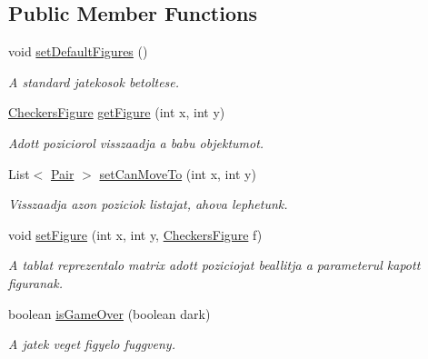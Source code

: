 \subsection*{Public Member Functions}
\begin{DoxyCompactItemize}
\item 
\hypertarget{classmodel_1_1_checkers_model_ac6911ccd3b1d3718db06fd8ea7f2d7b3}{}void \hyperlink{classmodel_1_1_checkers_model_ac6911ccd3b1d3718db06fd8ea7f2d7b3}{set\+Default\+Figures} ()\label{classmodel_1_1_checkers_model_ac6911ccd3b1d3718db06fd8ea7f2d7b3}

\begin{DoxyCompactList}\small\item\em A standard jatekosok betoltese. \end{DoxyCompactList}\item 
\hyperlink{classmodel_1_1_checkers_figure}{Checkers\+Figure} \hyperlink{classmodel_1_1_checkers_model_a3c802fe132a08baddf712e09df96cab9}{get\+Figure} (int x, int y)
\begin{DoxyCompactList}\small\item\em Adott poziciorol visszaadja a babu objektumot. \end{DoxyCompactList}\item 
List$<$ \hyperlink{classmodel_1_1_pair}{Pair} $>$ \hyperlink{classmodel_1_1_checkers_model_a5bf2d3775839b95e7f13cf3e765b6981}{set\+Can\+Move\+To} (int x, int y)
\begin{DoxyCompactList}\small\item\em Visszaadja azon poziciok listajat, ahova lephetunk. \end{DoxyCompactList}\item 
void \hyperlink{classmodel_1_1_checkers_model_ad36574e98ce2f7b1983d25c376e0a3e6}{set\+Figure} (int x, int y, \hyperlink{classmodel_1_1_checkers_figure}{Checkers\+Figure} f)
\begin{DoxyCompactList}\small\item\em A tablat reprezentalo matrix adott poziciojat beallitja a parameterul kapott figuranak. \end{DoxyCompactList}\item 
boolean \hyperlink{classmodel_1_1_checkers_model_a2825ba09fc35c7fa69c0ab470a32c0db}{is\+Game\+Over} (boolean dark)
\begin{DoxyCompactList}\small\item\em A jatek veget figyelo fuggveny. \end{DoxyCompactList}\item 

\end{DoxyCompactItemize}
